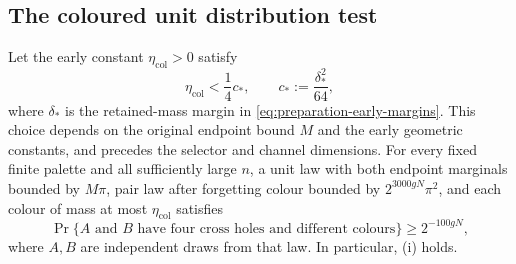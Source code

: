 \subsection{The coloured unit distribution test}

\begin{proposition}
\label{prop:coloured-distribution}
Let the early constant $\eta_{\mathrm{col}}>0$ satisfy
\[
 \eta_{\mathrm{col}}<\frac14c_* ,\qquad
 c_*:=\frac{\delta_*^2}{64},
\]
where $\delta_*$ is the retained-mass margin in
\eqref{eq:preparation-early-margins}. This choice depends on the original
endpoint bound $M$ and the early geometric constants, and precedes the
selector and channel dimensions. For every fixed finite palette and all
sufficiently large $n$, a unit law with both endpoint marginals bounded
by $M\pi$, pair law after forgetting colour bounded by $2^{3000gN}\pi^2$, and each
colour of mass at most $\eta_{\mathrm{col}}$ satisfies
\[
 \Pr\{A\text{ and }B\text{ have four cross holes and different colours}\}
 \ge 2^{-100gN},
\]
where $A,B$ are independent draws from that law. In particular,
\textup{(i)} holds.
\end{proposition}

